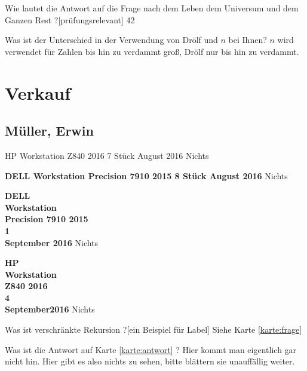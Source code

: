 \documentclass[a6paper,10pt,grid=front,print]{kartei}
\begin{document}
  \setcardpagelayout
  \begin{karte}[Lebensphilosophie]{Wie lautet die Antwort auf die Frage nach dem Leben dem Universum und dem Ganzen Rest ?}[prüfungsrelevant]
  42
  \end{karte}
  \begin{karte}[Zahlenkunde]{Was ist der Unterschied in der Verwendung von Drölf und $n$ bei Ihnen?}
  $n$ wird verwendet für Zahlen bis hin zu verdammt groß, Drölf nur bis hin zu verdammt.
  \end{karte}

\wedn
\section*{Verkauf}
\subsection*{Müller, Erwin}

\begin{karte}{HP Workstation Z840 2016  7 Stück August 2016}
Nichts
\end{karte}

\begin{karte}{\textbf{DELL Workstation Precision 7910 2015 8 Stück August 2016}}
Nichts
\end{karte}

\begin{karte}{\textbf{DELL\\Workstation\\Precision 7910 2015\\ 1\\September 2016}}
Nichts
\end{karte}

\begin{karte}{\textbf{HP\\Workstation\\Z840 2016\\ 4\\September2016}}
Nichts
\end{karte}



  \renewcommand{\kommentarstil}{\textsc}
  \begin{karte}{Was ist verschränkte Rekursion ?}[ein Beispiel für Label]
  \label{karte:antwort} Siehe Karte \ref{karte:frage}
  \end{karte}
  \begin{karte}{Was ist die Antwort auf Karte \ref{karte:antwort} ?}
  \label{karte:frage}
    Hier kommt man eigentlich gar nicht hin. Hier gibt es also nichts zu sehen, bitte blättern sie unauffällig weiter.
  \end{karte}
\end{document}
